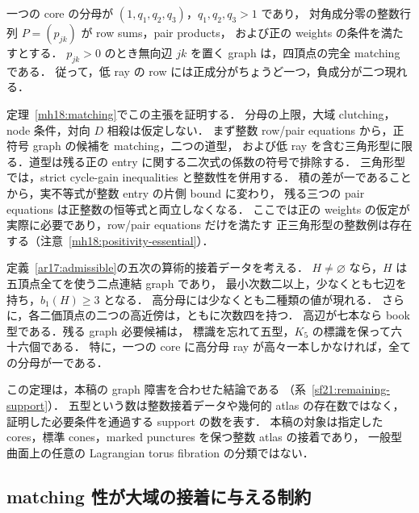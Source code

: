 \begin{theorem}
\label{ar18:main-matching}
一つの core の分母が $(1,q_1,q_2,q_3)$，$q_1,q_2,q_3>1$ であり，
対角成分零の整数行列 $P=(p_{jk})$ が row sums，pair products，
および正の weights の条件を満たすとする．
$p_{jk}>0$ のとき無向辺 $jk$ を置く graph は，四頂点の完全 matching である．
従って，低 ray の row には正成分がちょうど一つ，負成分が二つ現れる．
\end{theorem}

定理~\ref{mh18:matching}でこの主張を証明する．
分母の上限，大域 clutching，node 条件，対向 $D$ 相殺は仮定しない．
まず整数 row/pair equations から，正符号 graph の候補を matching，二つの道型，
および低 ray を含む三角形型に限る．道型は残る正の entry に関する二次式の係数の符号で排除する．
三角形型では，strict cycle-gain inequalities と整数性を併用する．
積の差が一であることから，実不等式が整数 entry の片側 bound に変わり，
残る三つの pair equations は正整数の恒等式と両立しなくなる．
ここでは正の weights の仮定が実際に必要であり，row/pair equations だけを満たす
正三角形型の整数例は存在する（注意~\ref{mh18:positivity-essential}）．

\begin{theorem}
\label{ar17:main-support}
定義~\ref{ar17:admissible}の五次の算術的接着データを考える．
$H\ne\varnothing$ なら，$H$ は五頂点全てを使う二点連結 graph であり，
最小次数二以上，少なくとも七辺を持ち，$b_1(H)\ge3$ となる．
高分母には少なくとも二種類の値が現れる．
さらに，各二価頂点の二つの高近傍は，ともに次数四を持つ．
高辺が七本なら book 型である．残る graph 必要候補は，
標識を忘れて五型，$K_5$ の標識を保って六十六個である．
特に，一つの core に高分母 ray が高々一本しかなければ，全ての分母が一である．
\end{theorem}

この定理は，本稿の graph 障害を合わせた結論である
（系~\ref{sf21:remaining-support}）．
五型という数は整数接着データや幾何的 atlas の存在数ではなく，
証明した必要条件を通過する support の数を表す．
本稿の対象は指定した cores，標準 cones，marked punctures を保つ整数 atlas の接着であり，
一般型曲面上の任意の Lagrangian torus fibration の分類ではない．

\subsection{matching 性が大域の接着に与える制約}

